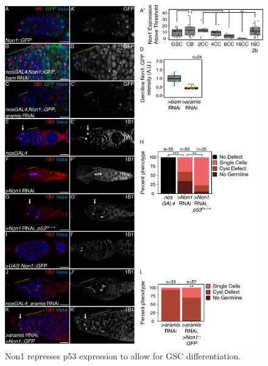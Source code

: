 \documentclass[12pt,oneside]{reedthesis}
\begin{document}
\begin{figure}

{\centering \includegraphics[width=6.5 in,height=8.9375 in]{./figure/Ribosome Biogenesis/Ribosome Biogenesis 5} 

}

\caption[Non1 represses p53 expression to allow for GSC differentiation.]{Non1 represses p53 expression to allow for GSC differentiation.}\label{fig:unnamed-chunk-14}
\end{figure}
\end{document}
